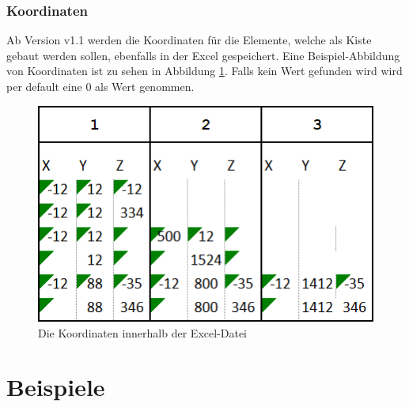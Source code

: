 \documentclass{book}
\begin{document}
		\subsection{Koordinaten}
			Ab Version v1.1 werden die Koordinaten für die Elemente, welche als Kiste gebaut werden sollen, ebenfalls in der Excel gespeichert. Eine Beispiel-Abbildung von Koordinaten ist zu sehen in Abbildung \ref{fig:koordinaten}. Falls kein Wert gefunden wird wird per default eine 0 als Wert genommen.
			\begin{figure}
				\centering
				\includegraphics[scale=0.48]{pics/excel/koordinaten.png}
				\caption{Die Koordinaten innerhalb der Excel-Datei}
				\label{fig:koordinaten}
			\end{figure}
	\chapter{Beispiele}
		
\end{document}
